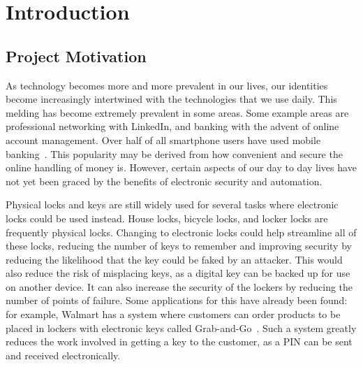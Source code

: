 \documentclass[12pt]{report}
\let\Oldsection\section
\renewcommand{\section}{\FloatBarrier\Oldsection}
\begin{document}

\endpreface
    

\chapter{Introduction} \label{introduction}


\section{Project Motivation} \label{project-motivation}

As technology becomes more and more prevalent in our lives, our identities become increasingly intertwined with the
technologies that we use daily. This melding has become extremely prevalent in some areas. Some example areas are
professional networking with LinkedIn, and banking with the advent of online account management. Over half of all
smartphone users have used mobile banking~\autocite{MOBILEBANKING}. This popularity may be derived
from how convenient and secure the online handling of money is. However, certain aspects of our day to day lives
have not yet been graced by the benefits of electronic security and automation.

Physical locks and keys are still widely used for several tasks where electronic locks could be used instead. House
locks, bicycle locks, and locker locks are frequently physical locks. Changing to electronic locks could help streamline
all of these locks, reducing the number of keys to remember and improving security by reducing the likelihood that the
key could be faked by an attacker. This would also reduce the risk of misplacing keys, as a digital key can be backed 
up for use on another device. It can also increase the security of the lockers by reducing the number of points of failure.
Some applications for this have already been found: for example, Walmart has a system 
where customers can order products to be placed in lockers with electronic keys called Grab-and-Go~\autocite{WALMART}. 
Such a system greatly reduces the work involved in getting a key to the customer, as a PIN can be sent and received 
electronically.
\end{document}
